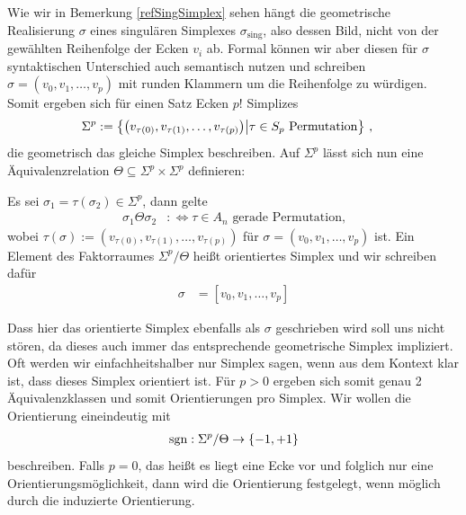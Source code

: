     Wie wir in Bemerkung \ref{refSingSimplex} sehen hängt die geometrische Realisierung \( \sigma \) eines singulären Simplexes \( \sigma_{\text{sing}} \), 
    also dessen Bild, nicht von der gewählten Reihenfolge der Ecken \( v_{i} \) ab. 
    Formal können wir aber diesen für \( \sigma \) syntaktischen Unterschied auch semantisch nutzen und schreiben \( \sigma = \left( v_{0}, v_{1}, \ldots, v_{p} \right) \)
    mit runden Klammern um die Reihenfolge zu würdigen. 
    Somit ergeben sich für einen Satz Ecken \( p! \) Simplizes 
    \begin{align}
      \Sigma^{p} &:= \left\{ \left( v_{\tau(0)}, v_{\tau(1)}, \ldots, v_{\tau(p)} \right) \middle| \tau\in S_{p} \text{ Permutation} \right\} \,\text{,}
    \end{align}
    die geometrisch das gleiche Simplex beschreiben.
    Auf \( \Sigma^{p} \) lässt sich nun eine Äquivalenz\-re\-la\-tion \( \Theta \subseteq \Sigma^{p}\times\Sigma^{p} \) definieren:

    \begin{definition}
      \label{defAeqRel}
      Es sei \( \sigma_{1} = \tau(\sigma_{2})\in\Sigma^{p} \), dann gelte
      \begin{align}
        \sigma_{1} \Theta \sigma_{2} &:\Leftrightarrow \tau \in A_{n} \text{ gerade Permutation,}
      \end{align}
      wobei \( \tau(\sigma) := \left( v_{\tau(0)}, v_{\tau(1)}, \ldots, v_{\tau(p)} \right) \) 
      für \( \sigma = \left( v_{0}, v_{1}, \ldots, v_{p} \right) \) ist.
      Ein Element des Faktorraumes \( \Sigma^{p}\slash\Theta \) heißt orientiertes Simplex und wir schreiben dafür
      \begin{align}
        \sigma &= \left[ v_{0}, v_{1}, \ldots, v_{p} \right]
      \end{align}
    \end{definition}

    Dass hier das orientierte Simplex ebenfalls als \( \sigma \) geschrieben wird soll uns nicht stören, da dieses auch immer das entsprechende geometrische Simplex impliziert.
    Oft werden wir einfachheitshalber nur Simplex sagen, wenn aus dem Kontext klar ist, dass dieses Simplex orientiert ist.
    Für \( p > 0 \) ergeben sich somit genau 2 Äquivalenzklassen und somit Orientierungen pro Simplex. 
    Wir wollen die Orientierung eineindeutig mit 
    \begin{align}
      \mathop{\mathrm{sgn}}\nolimits: \Sigma^{p}\slash\Theta \rightarrow \left\{ -1 , +1 \right\}
    \end{align}
    beschreiben.
    Falls \( p=0 \), das heißt es liegt eine Ecke vor und folglich nur eine Orientierungsmöglichkeit, dann wird die Orientierung festgelegt, wenn möglich durch die induzierte Orientierung.

